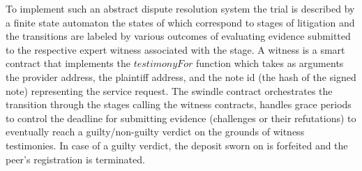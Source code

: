 \documentclass[a4paper,10pt]{article}
\begin{document}
To implement such an abstract dispute resolution system
the trial is described by a finite state automaton the states of which correspond
to stages of litigation and
the transitions are labeled by various outcomes of evaluating evidence submitted
to the respective expert witness associated with the stage. A witness
is a smart contract that implements the $\mathit{testimonyFor}$ function which takes
as arguments the provider address, the plaintiff address, and the note id (the hash of the signed note)
representing the service request.
The \gls{swindle} contract orchestrates the transition through the stages calling the witness contracts,
handles grace periods to control the deadline for submitting evidence (challenges or their refutations) to
eventually reach a guilty/non-guilty verdict on the grounds of witness testimonies.
In case of a guilty verdict, the deposit sworn on is forfeited and the peer's registration is
terminated.
\end{document}
